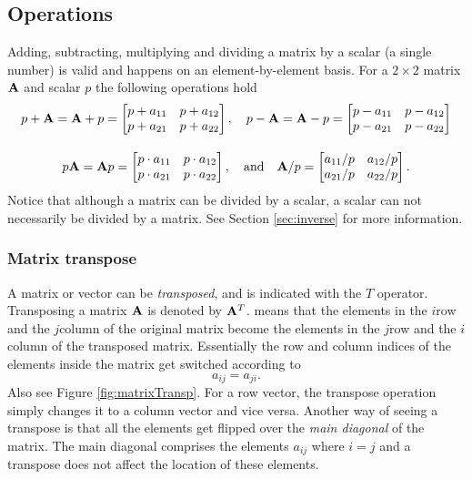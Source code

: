 \subsection{Operations}
Adding, subtracting, multiplying and dividing a matrix by a scalar (a single number) is valid and happens on an element-by-element basis. For a $2\times 2$ matrix $\mathbf{A}$ and scalar $p$ the following operations hold
\begin{equation*}
    \begin{gathered}
        p + \mathbf{A} = \mathbf{A} + p =\begin{bmatrix}
            p + a_{11}& p + a_{12}\\
            p + a_{21} & p + a_{22}
        \end{bmatrix}, \quad 
        p - \mathbf{A} = \mathbf{A} - p =\begin{bmatrix}
            p - a_{11}& p - a_{12}\\
            p - a_{21} & p - a_{22}
        \end{bmatrix}\\[1em]
            p \mathbf{A} = \mathbf{A} p = \begin{bmatrix}
            p\cdot a_{11}& p\cdot a_{12}\\
            p\cdot a_{21} & p\cdot a_{22}
        \end{bmatrix}, \quad \text{and} \quad \mathbf{A} / p= \begin{bmatrix}
             a_{11}/p& a_{12}/p\\
             a_{21}/p & a_{22}/p
        \end{bmatrix}.
    \end{gathered}
\end{equation*}
Notice that although a matrix can be divided by a scalar, a scalar can not necessarily be divided by a matrix. See Section \ref{sec:inverse} for more information. 

\subsubsection{Matrix transpose}
A matrix or vector can be \textit{transposed}, and is indicated with the $T$ operator. Transposing a matrix $\mathbf{A}$ is denoted by $\mathbf{A}^T$.  means that the elements in the $i$\th row and the $j$\th column of the original matrix become the elements in the $j$\th row and the $i$\th column of the transposed matrix. Essentially the row and column indices of the elements inside the matrix get switched according to
\begin{equation}\label{eq:matrixTransposition}
    a_{ij} = a_{ji}.
\end{equation} 
Also see Figure \ref{fig:matrixTransp}. For a row vector, the transpose operation simply changes it to a column vector and vice versa. Another way of seeing a transpose is that all the elements get flipped over the \textit{main diagonal} of the matrix. The main diagonal comprises the elements $a_{ij}$ where $i=j$ and a transpose does not affect the location of these elements. 

